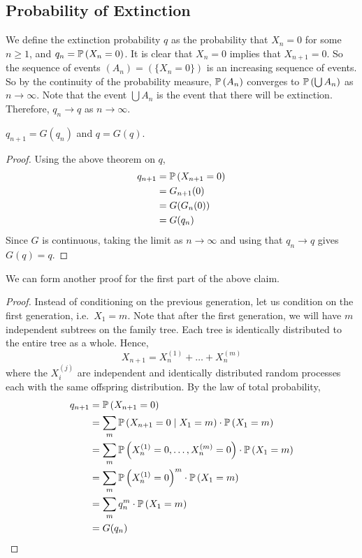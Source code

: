 \subsection{Probability of Extinction}
We define the extinction probability \(q\) as the probability that \(X_n = 0\) for some \(n \geq 1\), and \(q_n = \mathbb{P}\left({X_n = 0}\right)\).
It is clear that \(X_n = 0\) implies that \(X_{n+1} = 0\).
So the sequence of events \((A_n) = (\{ X_n = 0 \})\) is an increasing sequence of events.
So by the continuity of the probability measure, \(\mathbb{P}\left({A_n}\right)\) converges to \(\mathbb{P}\left({\bigcup A_n}\right)\) as \(n \to \infty\).
Note that the event \(\bigcup A_n\) is the event that there will be extinction.
Therefore, \(q_n \to q\) as \(n \to \infty\).
\begin{claim}
	\(q_{n+1} = G(q_n)\) and \(q = G(q)\).
\end{claim}
\begin{proof}
	Using the above theorem on \(q\),
	\begin{align*}
		q_{n+1} & = \mathbb{P}\left({X_{n+1} = 0}\right) \\
		        & = G_{n+1}(0)         \\
		        & = G(G_n(0))          \\
		        & = G(q_n)
	\end{align*}
	Since \(G\) is continuous, taking the limit as \(n \to \infty\) and using that \(q_n \to q\) gives \(G(q) = q\).
\end{proof}
\noindent We can form another proof for the first part of the above claim.
\begin{proof}
	Instead of conditioning on the previous generation, let us condition on the first generation, i.e.\ \(X_1 = m\).
	Note that after the first generation, we will have \(m\) independent subtrees on the family tree.
	Each tree is identically distributed to the entire tree as a whole.
	Hence,
	\[
		X_{n+1} = X_n^{(1)} + \dots + X_n^{(m)}
	\]
	where the \(X_i^{(j)}\) are independent and identically distributed random processes each with the same offspring distribution.
	By the law of total probability,
	\begin{align*}
		q_{n+1} & = \mathbb{P}\left({X_{n+1} = 0}\right)                                                     \\
		        & = \sum_m \mathbb{P}\left({X_{n+1} = 0 \mid X_1 = m}\right) \cdot \mathbb{P}\left({X_1 = m}\right)            \\
		        & = \sum_m \mathbb{P}\left({X_n^{(1)} = 0, \dots, X_n^{(m)} = 0}\right) \cdot \mathbb{P}\left({X_1 = m}\right) \\
		        & = \sum_m \mathbb{P}\left({X_n^{(1)} = 0}\right)^m \cdot \mathbb{P}\left({X_1 = m}\right)                     \\
		        & = \sum_m q_n^m \cdot \mathbb{P}\left({X_1 = m}\right)                                      \\
		        & = G(q_n)
	\end{align*}
\end{proof}

